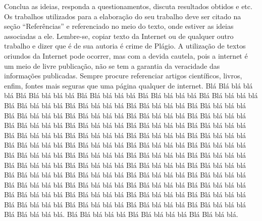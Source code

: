 \documentclass[times, 10pt,twocolumn]{article}
\begin{document}
Conclua as ideias, responda a questionamentos, discuta resultados obtidos e etc.
Os trabalhos utilizados para a elaboração do seu trabalho deve ser citado na seção “Referências” e referenciado no meio do texto, onde estiver as ideias associadas a ele. Lembre-se, copiar texto da Internet ou de qualquer outro trabalho e dizer que é de sua autoria é crime de Plágio. A utilização de textos oriundos da Internet pode ocorrer, mas com a devida cautela, pois a internet é um meio de livre publicação, não se tem a garantia da veracidade das informações publicadas. Sempre procure referenciar artigos científicos, livros, enfim, fontes mais seguras que uma página qualquer de internet.
Blá Blá blá blá blá Blá Blá blá blá blá Blá Blá blá blá blá Blá Blá blá blá blá Blá Blá blá blá blá Blá Blá blá blá blá Blá Blá blá blá blá Blá Blá blá blá blá Blá Blá blá blá blá Blá Blá blá blá blá
Blá Blá blá blá blá Blá Blá blá blá blá Blá Blá blá blá blá Blá Blá blá blá blá Blá Blá blá blá blá Blá Blá blá blá blá Blá Blá blá blá blá Blá Blá blá blá blá Blá Blá blá blá blá Blá Blá blá blá blá
Blá Blá blá blá blá Blá Blá blá blá blá Blá Blá blá blá blá Blá Blá blá blá blá Blá Blá blá blá blá Blá Blá blá blá blá Blá Blá blá blá blá Blá Blá blá blá blá Blá Blá blá blá blá Blá Blá blá blá blá
Blá Blá blá blá blá Blá Blá blá blá blá Blá Blá blá blá blá Blá Blá blá blá blá Blá Blá blá blá blá Blá Blá blá blá blá Blá Blá blá blá blá Blá Blá blá blá blá Blá Blá blá blá blá Blá Blá blá blá blá
Blá Blá blá blá blá Blá Blá blá blá blá Blá Blá blá blá blá Blá Blá blá blá blá Blá Blá blá blá blá Blá Blá blá blá blá Blá Blá blá blá blá Blá Blá blá blá blá Blá Blá blá blá blá Blá Blá blá blá blá. 
Blá Blá blá blá blá Blá Blá blá blá blá Blá Blá blá blá.

\nocite{ex1,ex2}


\end{document}
